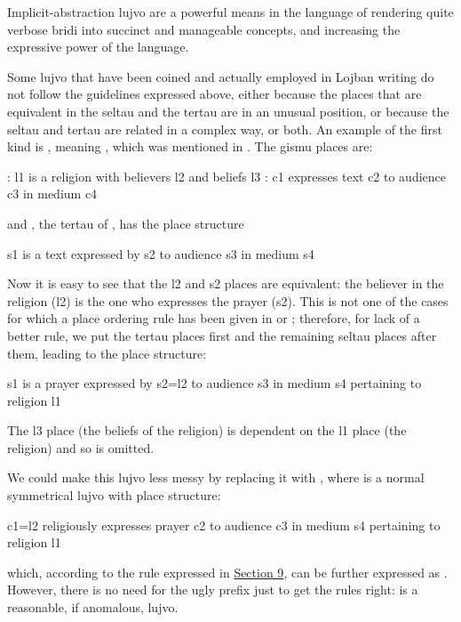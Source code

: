 Implicit-abstraction lujvo are a powerful means in the
    language of rendering quite verbose bridi into succinct and
    manageable concepts, and increasing the expressive power of the
    language.



Some lujvo that have been coined and actually employed in
    Lojban writing do not follow the guidelines expressed above,
    either because the places that are equivalent in the seltau and
    the tertau are in an unusual position, or because the seltau
    and tertau are related in a complex way, or both. An example of
    the first kind is , meaning , which was
    mentioned in . The gismu places
    are:
\begin{example}
: l1 is a religion with believers l2\n
\T	and beliefs l3\n
{}: c1 expresses text c2 to audience c3\n
\T	in medium c4
\end{example}

{\noindent}and , the tertau of , has the place
    structure
\begin{example}
s1 is a text expressed by s2 to audience s3\n
\T	in medium s4

Now it is easy to see that the l2 and s2 places are equivalent:  the
believer in the religion (l2) is the one who expresses the prayer (s2).
This is not one of the cases for which a place ordering rule has been
given in  or ; therefore, for lack of a better rule,
we put the tertau places first and the remaining seltau places after them,
leading to the place structure:
\end{example}

\begin{example}
s1 is a prayer expressed by s2=l2 to audience s3\n
\T	in medium s4 pertaining to religion l1
\end{example}

The l3 place (the beliefs of the religion) is dependent on
    the l1 place (the religion) and so is omitted.

We could make this lujvo less messy by replacing it with
    , where  is a normal symmetrical
    lujvo with place structure:
\begin{example}
c1=l2 religiously expresses\n
\T	prayer c2 to audience c3\n
\T	in medium s4 pertaining to religion l1
\end{example}

{\noindent}which, according to the rule expressed in \hyperref[sec:12:9]{Section
    9}, can be further expressed as . However,
    there is no need for the ugly  prefix just to get
    the rules right:  is a reasonable, if anomalous,
    lujvo. 

